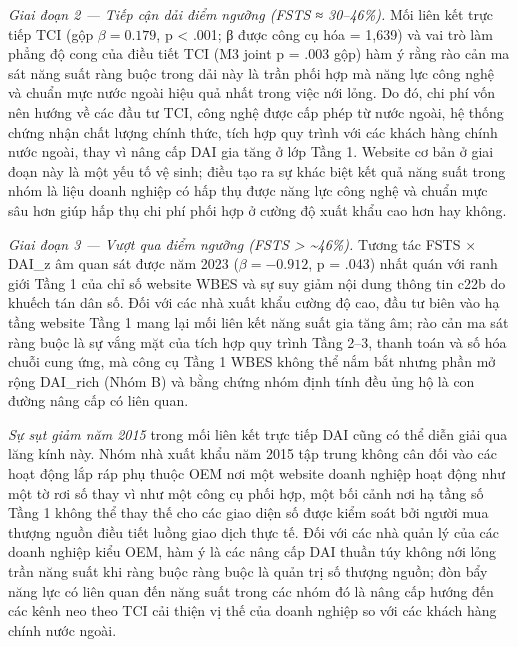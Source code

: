 \documentclass[12pt,a4paper]{article}
\begin{document}
\emph{Giai đoạn 2 --- Tiếp cận dải điểm ngưỡng (FSTS ≈ 30--46\%).} Mối
liên kết trực tiếp TCI (gộp \(\beta = 0.179\), p \textless{} .001; β
được công cụ hóa = 1,639) và vai trò làm phẳng độ cong của điều tiết TCI
(M3 joint p = .003 gộp) hàm ý rằng rào cản ma sát năng suất ràng buộc
trong dải này là trần phối hợp mà năng lực công nghệ và chuẩn mực nước
ngoài hiệu quả nhất trong việc nới lỏng. Do đó, chi phí vốn nên hướng về
các đầu tư TCI, công nghệ được cấp phép từ nước ngoài, hệ thống chứng
nhận chất lượng chính thức, tích hợp quy trình với các khách hàng chính
nước ngoài, thay vì nâng cấp DAI gia tăng ở lớp Tầng 1. Website cơ bản ở
giai đoạn này là một yếu tố vệ sinh; điều tạo ra sự khác biệt kết quả
năng suất trong nhóm là liệu doanh nghiệp có hấp thụ được năng lực công
nghệ và chuẩn mực sâu hơn giúp hấp thụ chi phí phối hợp ở cường độ xuất
khẩu cao hơn hay không.

\emph{Giai đoạn 3 --- Vượt qua điểm ngưỡng (FSTS \textgreater{}
\textasciitilde46\%).} Tương tác FSTS × DAI\_z âm quan sát được năm 2023
(\(\beta = −0.912\), p = .043) nhất quán với ranh giới Tầng 1 của chỉ số
website WBES và sự suy giảm nội dung thông tin c22b do khuếch tán dân
số. Đối với các nhà xuất khẩu cường độ cao, đầu tư biên vào hạ tầng
website Tầng 1 mang lại mối liên kết năng suất gia tăng âm; rào cản ma
sát ràng buộc là sự vắng mặt của tích hợp quy trình Tầng 2--3, thanh
toán và số hóa chuỗi cung ứng, mà công cụ Tầng 1 WBES không thể nắm bắt
nhưng phần mở rộng DAI\_rich (Nhóm B) và bằng chứng nhóm định tính đều
ủng hộ là con đường nâng cấp có liên quan.

\emph{Sự sụt giảm năm 2015} trong mối liên kết trực tiếp DAI cũng có thể
diễn giải qua lăng kính này. Nhóm nhà xuất khẩu năm 2015 tập trung không
cân đối vào các hoạt động lắp ráp phụ thuộc OEM nơi một website doanh
nghiệp hoạt động như một tờ rơi số thay vì như một công cụ phối hợp, một
bối cảnh nơi hạ tầng số Tầng 1 không thể thay thế cho các giao diện số
được kiểm soát bởi người mua thượng nguồn điều tiết luồng giao dịch thực
tế. Đối với các nhà quản lý của các doanh nghiệp kiểu OEM, hàm ý là các
nâng cấp DAI thuần túy không nới lỏng trần năng suất khi ràng buộc ràng
buộc là quản trị số thượng nguồn; đòn bẩy năng lực có liên quan đến năng
suất trong các nhóm đó là nâng cấp hướng đến các kênh neo theo TCI cải
thiện vị thế của doanh nghiệp so với các khách hàng chính nước ngoài.
\end{document}
